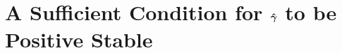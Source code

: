 %
%






\section{A Sufficient Condition for $\boldsymbol{\hat{\gamma}}$ to be Positive Stable} \label{appB}

